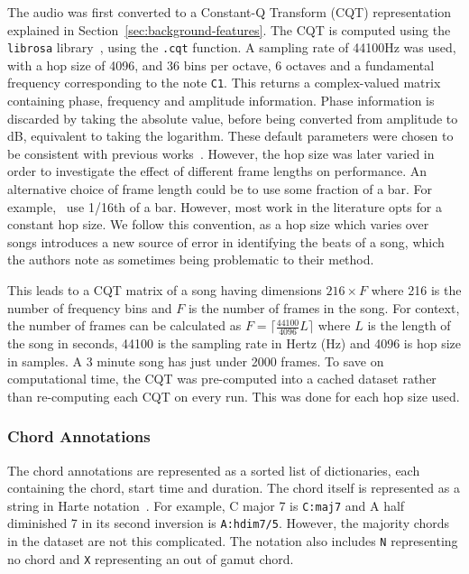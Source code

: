 The audio was first converted to a Constant-Q Transform (CQT) representation explained in Section~\ref{sec:background-features}. The CQT is computed using the \texttt{librosa} library~\citep{librosa}, using the \texttt{.cqt} function. A sampling rate of 44100Hz was used, with a hop size of 4096, and 36 bins per octave, 6 octaves and a fundamental frequency corresponding to the note \texttt{C1}. This returns a complex-valued matrix containing phase, frequency and amplitude information. Phase information is discarded by taking the absolute value, before being converted from amplitude to dB, equivalent to taking the logarithm.  These default parameters were chosen to be consistent with previous works~\citep{StructuredTraining}. However, the hop size was later varied in order to investigate the effect of different frame lengths on performance. An alternative choice of frame length could be to use some fraction of a bar. For example,~\citet{MelodyTranscriptionViaGenerativePreTraining} use 1/16th of a bar. However, most work in the literature opts for a constant hop size. We follow this convention, as a hop size which varies over songs introduces a new source of error in identifying the beats of a song, which the authors note as sometimes being problematic to their method. 

This leads to a CQT matrix of a song having dimensions $216 \times F$ where 216 is the number of frequency bins and $F$ is the number of frames in the song. For context, the number of frames can be calculated as $F = \lceil \frac{44100}{4096} L  \rceil$ where $L$ is the length of the song in seconds, 44100 is the sampling rate in Hertz (Hz) and 4096 is hop size in samples. A 3 minute song has just under 2000 frames. To save on computational time, the CQT was pre-computed into a cached dataset rather than re-computing each CQT on every run. This was done for each hop size used.

\subsubsection{Chord Annotations}

The chord annotations are represented as a sorted list of dictionaries, each containing the chord, start time and duration. The chord itself is represented as a string in Harte notation~\citep{HarteNotation}. For example, C major 7 is \texttt{C:maj7} and A half diminished 7 in its second inversion is \texttt{A:hdim7/5}. However, the majority chords in the dataset are not this complicated. The notation also includes \texttt{N} representing no chord and \texttt{X} representing an out of gamut chord. 

